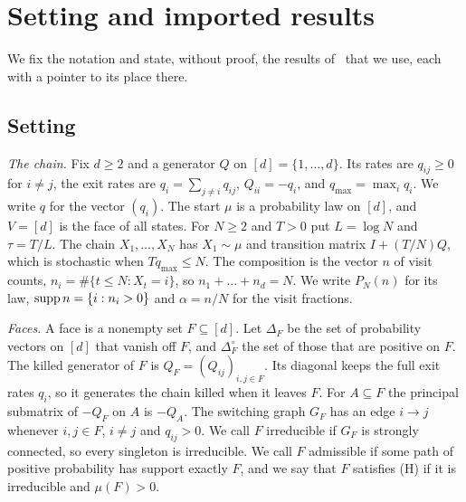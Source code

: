 \section{Setting and imported results}\label{sec:prelim}

We fix the notation and state, without proof, the results of~\cite{paperC1} that we
use, each with a pointer to its place there.

\subsection{Setting}\label{sec:notation}

\emph{The chain.} Fix $d\ge2$ and a generator $Q$ on $[d]=\{1,\dots,d\}$. Its rates
are $q_{ij}\ge0$ for $i\ne j$, the exit rates are $q_i=\sum_{j\ne i}q_{ij}$,
$Q_{ii}=-q_i$, and $q_{\max}=\max_iq_i$. We write $q$ for the vector $(q_i)$. The
start $\mu$ is a probability law on $[d]$, and $V=[d]$ is the face of all states.
For $N\ge2$ and $T>0$ put $L=\log N$ and $\tau=T/L$. The chain
$X_1,\dots,X_N$ has $X_1\sim\mu$ and transition matrix $I+(T/N)Q$, which is
stochastic when $Tq_{\max}\le N$. The composition is the vector $n$ of visit counts,
$n_i=\#\{t\le N:X_t=i\}$, so $n_1+\dots+n_d=N$. We write $P_N(n)$ for its law,
$\operatorname{supp} n=\{i:n_i>0\}$ and $\alpha=n/N$ for the visit fractions.

\emph{Faces.} A face is a nonempty set $F\subseteq[d]$. Let $\Delta_F$ be the set of
probability vectors on $[d]$ that vanish off $F$, and $\Delta_F^\circ$ the set of
those that are positive on $F$. The killed generator of $F$ is
$Q_F=(Q_{ij})_{i,j\in F}$. Its diagonal keeps the full exit rates $q_i$, so it
generates the chain killed when it leaves $F$. For $A\subseteq F$ the principal
submatrix of $-Q_F$ on $A$ is $-Q_A$. The switching graph $G_F$ has an edge $i\to j$
whenever $i,j\in F$, $i\ne j$ and $q_{ij}>0$. We call $F$ irreducible if $G_F$ is
strongly connected, so every singleton is irreducible. We call $F$ admissible if
some path of positive probability has support exactly $F$, and we say that $F$
satisfies (H) if it is irreducible and $\mu(F)>0$.

